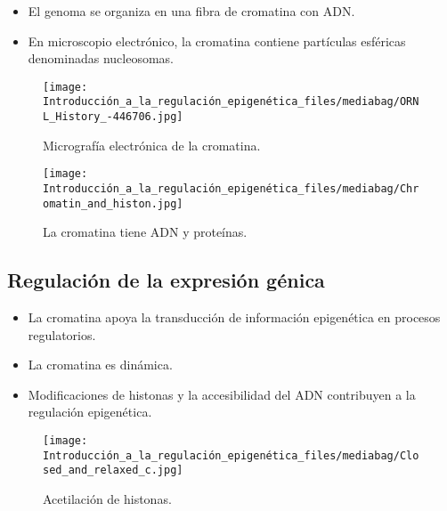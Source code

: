 \documentclass[
  letterpaper,
  DIV=11,
  numbers=noendperiod]{scrartcl}
\begin{document}
\begin{itemize}
\item
  El genoma se organiza en una fibra de cromatina con ADN.
\item
  En microscopio electrónico, la cromatina contiene partículas esféricas
  denominadas nucleosomas.
\end{itemize}

\begin{figure}[H]

{\centering \texttt{[image: Introducción\_a\_la\_regulación\_epigenética\_files/mediabag/ORNL\_History\_-446706.jpg]}

}

\caption{Micrografía electrónica de la cromatina.}

\end{figure}%
\begin{figure}[H]

{\centering \texttt{[image: Introducción\_a\_la\_regulación\_epigenética\_files/mediabag/Chromatin\_and\_histon.jpg]}

}

\caption{La cromatina tiene ADN y proteínas.}

\end{figure}%

\subsection{Regulación de la expresión
génica}\label{regulaciuxf3n-de-la-expresiuxf3n-guxe9nica}

\begin{itemize}
\item
  La cromatina apoya la transducción de información epigenética en
  procesos regulatorios.
\item
  La cromatina es dinámica.
\item
  Modificaciones de histonas y la accesibilidad del ADN contribuyen a la
  regulación epigenética.
\end{itemize}

\begin{figure}[H]

{\centering \texttt{[image: Introducción\_a\_la\_regulación\_epigenética\_files/mediabag/Closed\_and\_relaxed\_c.jpg]}

}

\caption{Acetilación de histonas.}

\end{figure}%
\end{document}
